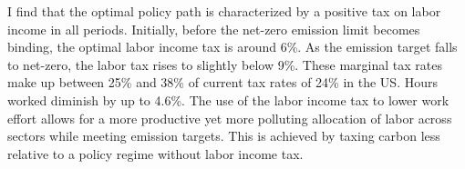 I find that the optimal policy path is characterized by a positive tax on labor income in all periods. Initially, before the net-zero emission limit becomes binding, the optimal labor income tax is around 6\%. As the emission target falls to net-zero, the labor tax rises to slightly below 9\%. These marginal tax rates make up between 25\% and 38\% of current tax rates of 24\% in the US. Hours worked diminish by up to 4.6\%. The use of the labor income tax to lower work effort allows for a more productive yet more polluting allocation of labor across sectors while meeting emission targets. This is achieved by taxing carbon less relative to a policy regime without labor income tax. 

\begin{comment}
Third, the findings are especially interesting as the provision of the environmental public good and equity have been perceived as competing targets in the literature. When the poor consume more of the polluting good, a corrective tax is regressive \citep{ Fried2018TheGenerations, Sager2019IncomeCurves}. %
In contrast to this literature, the present paper provides an argument for progressive income taxes under perfect income-risk sharing suggesting a double dividend of redistribution: equity and efficient externality mitigation. %

content...
\end{comment}